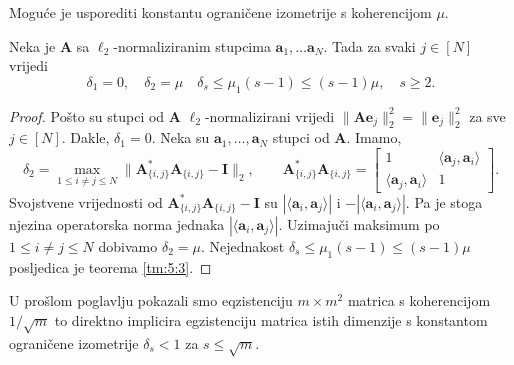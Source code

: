 \documentclass[a4paper,twoside,12pt]{memoir} %
\newcommand{\vect}[1]{\mathbf{#1}}
\renewcommand{\vec}{\vect}
\newcommand{\norm}[1]{\|{#1}\|}
\begin{document}
Mogu\'ce je usporediti konstantu ograni\v{c}ene izometrije s koherencijom $\mu$.
\begin{prop}\label{prop:6:2}
    Neka je $\vec A$ sa $\ell_2$-normaliziranim stupcima $\vec a_1, \dots \vec a_N$. Tada za svaki $j \in [N]$ vrijedi
    \begin{equation*}
        \delta_1 = 0, \quad \delta_2 = \mu \quad \delta_s \leq \mu_1(s-1) \leq (s-1)\mu, \quad s \geq 2. 
    \end{equation*}
\end{prop}
\begin{proof}
    Po\v{s}to su stupci od $\vec A$ $\ell_2$-normalizirani vrijedi $\norm{\vec{Ae}_j}_2^2 = \norm{\vec e_j}_2^2$ za sve $j \in [N]$. Dakle, $\delta_1 = 0$. Neka su $\vec a_1, \dots, \vec a_N$ stupci od $\vec A$. Imamo,
    \begin{equation}
        \delta_2 = \max_{1 \leq i \neq j \leq N} \norm{\vec A^*_{\{i,j\}}\vec A_{\{i,j\}} - \vec I}_2, \quad \quad \vec A^*_{\{i,j\}}\vec A_{\{i,j\}} = 
        \begin{bmatrix*}
            1 & \langle \vec a_j, \vec a_i \rangle \\
            \langle \vec a_j, \vec a_i \rangle  & 1
        \end{bmatrix*}.
    \end{equation}
    Svojstvene vrijednosti od $\vec A^*_{\{i,j\}}\vec A_{\{i,j\}} - \vec I$ su $|\langle \vec a_i, \vec a_j \rangle |$ i $-|\langle \vec a_i, \vec a_j \rangle |$. Pa je stoga njezina operatorska norma jednaka $|\langle \vec a_i, \vec a_j \rangle |$. Uzimaju\v{c}i maksimum po $1 \leq i \neq j \leq N$ dobivamo $\delta_2 = \mu$. Nejednakost $\delta_s \leq \mu_1(s-1) \leq (s-1)\mu$ posljedica je teorema \ref{tm:5:3}.
\end{proof}

U pro\v{s}lom poglavlju pokazali smo eqzistenciju $m \times m^2$ matrica s koherencijom $1/\sqrt{m}$ to direktno implicira egzistenciju matrica istih dimenzije s konstantom ograni\v{c}ene izometrije $\delta_s < 1$ za $s \leq \sqrt{m}$.
\end{document}
